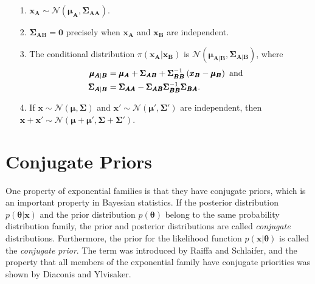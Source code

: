 \begin{itemize}
    \item[1.] $\pmb{x}_{\pmb{A}}\sim\mathcal{N}\left(\pmb{\mu}_{\pmb{A}}, \pmb{\Sigma}_{\pmb{AA}}\right)$.
    \item[2.] $\pmb{\Sigma}_{\pmb{AB}}=\pmb{0}$ precisely when $\pmb{x}_{\pmb{A}}$ and $\pmb{x}_{\pmb{B}}$ are independent.
    \item[3.] The conditional distribution $\pi\left(\pmb{x}_{\pmb{A}}|\pmb{x}_{\pmb{B}}\right)$ is $\mathcal{N}\left(\pmb{\mu}_{\pmb{A}|\pmb{B}}, \pmb{\Sigma}_{\pmb{A}|\pmb{B}}\right)$, where
    \begin{align*}
        \pmb{\mu}_{\pmb{A}|\pmb{B}} &= \pmb{\mu}_{\pmb{A}}+\pmb{\Sigma}_{\pmb{AB}}+\pmb{\Sigma}_{\pmb{BB}}^{-1}\left(\pmb{x}_{\pmb{B}}-\pmb{\mu}_{\pmb{B}}\right) \hbox{ and} \\
        \pmb{\Sigma}_{\pmb{A}|\pmb{B}} &= \pmb{\Sigma}_{\pmb{AA}}-\pmb{\Sigma}_{\pmb{AB}}\pmb{\Sigma}_{\pmb{BB}}^{-1}\pmb{\Sigma}_{\pmb{BA}}.
    \end{align*}
    \item[4.] If $\pmb{x}\sim\mathcal{N}\left(\pmb{\mu}, \pmb{\Sigma}\right)$ and $\pmb{x}'\sim\mathcal{N}\left(\pmb{\mu'}, \pmb{\Sigma'}\right)$ are independent, then $\pmb{x}+\pmb{x'}\sim\mathcal{N}\left(\pmb{\mu}+ \pmb{\mu'}, \pmb{\Sigma}+ \pmb{\Sigma'}\right)$\autocite[Cf.][]{rue2005gaussian}.
\end{itemize}
\section{Conjugate Priors}
One property of exponential families is that they have conjugate priors, which is an important property in Bayesian statistics. If the posterior distribution $p\left(\pmb{\theta}|\pmb{x}\right)$ and the prior distribution $p\left(\pmb{\theta}\right)$ belong to the same probability distribution family, the prior and posterior distributions are called \textit{conjugate} distributions. Furthermore, the prior for the likelihood function $p\left(\pmb{x}|\pmb{\theta}\right)$ is called the \textit{conjugate prior}. The term was introduced by Raiffa and Schlaifer\autocite[Cf.][]{raiffaapplied}, and the property that all members of the exponential family have conjugate priorities was shown by Diaconis and Ylvisaker\autocite[Cf.][]{diaconis1979conjugate}.
